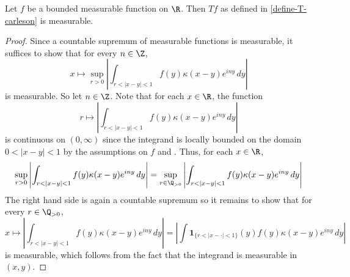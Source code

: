 \begin{lemma}
    \label{real-Carleson-operator-measurable}
    \leanok
    Let $f$ be a bounded measurable function on $\R$. Then $Tf$ as defined in \eqref{define-T-carleson} is measurable.
\end{lemma}
\begin{proof}
    \leanok
    Since a countable supremum of measurable functions is measurable, it suffices to show that for every $n\in\Z$,
    \begin{equation*}
        x \mapsto \sup_{r>0}\left|\int_{r<|x-y|<1} f(y)\kappa(x-y) e^{iny}\, dy\right|
    \end{equation*}
    is measurable. So let $n\in\Z$.
    Note that for each $x\in\R$, the function
    \begin{equation*}
        r \mapsto \left|\int_{r<|x-y|<1} f(y)\kappa(x-y) e^{iny}\, dy\right|
    \end{equation*}
    is continuous on $(0,\infty)$ since the integrand is locally bounded on the domain $0<|x-y|<1$ by the assumptions on $f$ and .
    Thus, for each $x\in\R$,
    \begin{equation*}
        \sup_{r>0}\left|\int_{r<|x-y|<1} f(y)\kappa(x-y) e^{iny}\, dy\right|
        =\sup_{r\in\Q_{>0}}\left|\int_{r<|x-y|<1} f(y)\kappa(x-y) e^{iny}\, dy\right|
    \end{equation*}
    The right hand side is again a countable supremum so it remains to show that for every $r\in\Q_{>0}$,
    \begin{equation*}
        x \mapsto \left|\int_{r<|x-y|<1} f(y)\kappa(x-y) e^{iny}\, dy\right| = \left|\int \mathbf{1}_{\{r<|x-\cdot|<1\}}(y) f(y)\kappa(x-y) e^{iny}\, dy\right|
    \end{equation*}
    is measurable, which follows from the fact that the integrand is measurable in $(x,y)$.
\end{proof}


